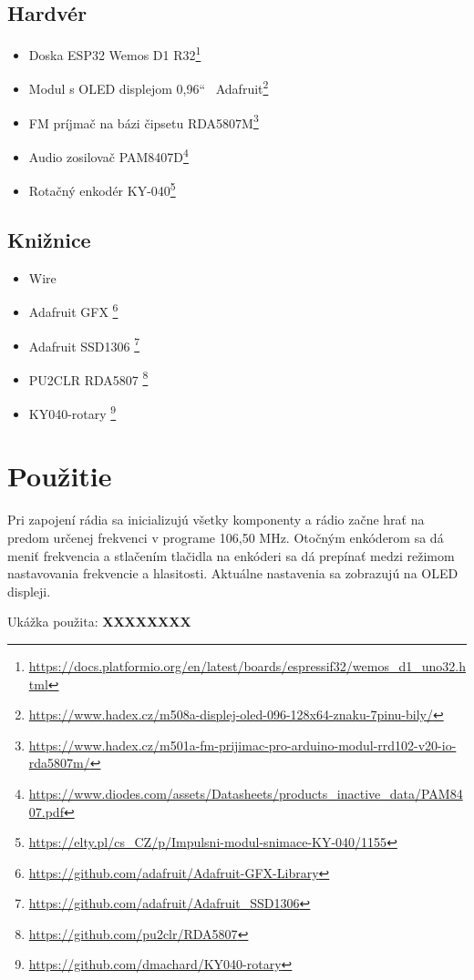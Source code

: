 \documentclass[11pt, a4paper]{article}
\begin{document}
\subsection{Hardvér}
\begin{itemize}
    \item Doska ESP32 Wemos D1 R32\footnote{\url{https://docs.platformio.org/en/latest/boards/espressif32/wemos_d1_uno32.html}}
    \item Modul s OLED displejom 0,96`` \-\ Adafruit\footnote{\url{https://www.hadex.cz/m508a-displej-oled-096-128x64-znaku-7pinu-bily/}}
    \item FM príjmač na bázi čipsetu RDA5807M\footnote{\url{https://www.hadex.cz/m501a-fm-prijimac-pro-arduino-modul-rrd102-v20-io-rda5807m/}}
    \item Audio zosilovač PAM8407D\footnote{\url{https://www.diodes.com/assets/Datasheets/products_inactive_data/PAM8407.pdf}}
    \item Rotačný enkodér KY-040\footnote{\url{https://elty.pl/cs_CZ/p/Impulsni-modul-snimace-KY-040/1155}}
\end{itemize}
\subsection{Knižnice}
\begin{itemize}
    \item Wire 
    \item Adafruit GFX \footnote{\url{https://github.com/adafruit/Adafruit-GFX-Library}}
    \item Adafruit SSD1306 \footnote{\url{https://github.com/adafruit/Adafruit_SSD1306}}
    \item PU2CLR RDA5807 \footnote{\url{https://github.com/pu2clr/RDA5807}} 
    \item KY040-rotary \footnote{\url{https://github.com/dmachard/KY040-rotary}} 
\end{itemize}

\section{Použitie}
Pri zapojení rádia sa inicializujú všetky komponenty a rádio začne hrať na predom
určenej frekvenci v programe 106,50 MHz. Otočným enkóderom sa 
dá meniť frekvencia a stlačením tlačidla na enkóderi sa dá prepínať medzi 
režimom nastavovania frekvencie a hlasitosti. Aktuálne nastavenia sa zobrazujú 
na OLED displeji.

Ukážka použita: \textbf{XXXXXXXX}
\end{document}
